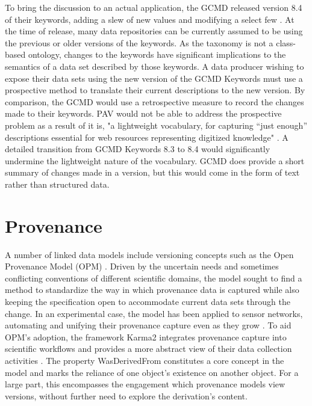 To bring the discussion to an actual application, the GCMD released version 8.4 of their keywords, adding a slew of new values and modifying a select few \cite{Stevens2016}.
At the time of release, many data repositories can be currently assumed to be using the previous or older versions of the keywords.
As the taxonomy is not a class-based ontology, changes to the keywords have significant implications to the semantics of a data set described by those keywords.
A data producer wishing to expose their data sets using the new version of the GCMD Keywords must use a prospective method to translate their current descriptions to the new version.
By comparison, the GCMD would use a retrospective measure to record the changes made to their keywords.
PAV would not be able to address the prospective problem as a result of it is, "a lightweight vocabulary, for capturing “just enough” descriptions essential for web resources representing digitized knowledge" \cite{Ciccarese2013}.
A detailed transition from GCMD Keywords 8.3 to 8.4 would significantly undermine the lightweight nature of the vocabulary.
GCMD does provide a short summary of changes made in a version, but this would come in the form of text rather than structured data.

\section{Provenance}

A number of linked data models include versioning concepts such as the Open Provenance Model (OPM) \cite{moreau2008open}.
Driven by the uncertain needs and sometimes conflicting conventions of different scientific domains, the model sought to find a method to standardize the way in which provenance data is captured while also keeping the specification open to accommodate current data sets through the change.
In an experimental case, the model has been applied to sensor networks, automating and unifying their provenance capture even as they grow \cite{5478496}.
To aid OPM's adoption, the framework Karma2 integrates provenance capture into scientific workflows and provides a more abstract view of their data collection activities \cite{simmhan2010karma2}.
The property WasDerivedFrom constitutes a core concept in the model and marks the reliance of one object's existence on another object.
For a large part, this encompasses the engagement which provenance models view versions, without further need to explore the derivation's content.


